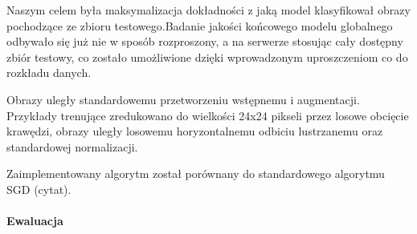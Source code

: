   Naszym celem była maksymalizacja dokładności z jaką model klasyfikował obrazy pochodzące ze
  zbioru testowego.Badanie jakości końcowego modelu globalnego odbywało się już nie w sposób
  rozproszony, a na serwerze stosując cały dostępny zbiór testowy, co zostało umożliwione dzięki wprowadzonym uproszczeniom co do rozkładu danych.

  Obrazy uległy standardowemu przetworzeniu wstępnemu i augmentacji. Przykłady trenujące zredukowano do wielkości 24x24 pikseli przez losowe obcięcie krawędzi, obrazy uległy losowemu horyzontalnemu odbiciu lustrzanemu  oraz standardowej normalizacji.

  Zaimplementowany algorytm został porównany do standardowego algorytmu SGD (cytat).


  \paragraph{Ewaluacja}